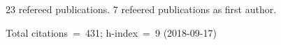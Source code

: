 23 refereed publications. 7 refeered publications as first author.

               Total citations~=~431; h-index~=~9 (2018-09-17)